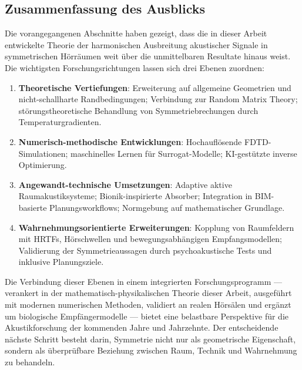 ﻿\documentclass[12pt, a4paper]{article}
\theoremstyle{definition}
\theoremstyle{remark}
\begin{document}
\subsection{Zusammenfassung des Ausblicks}

Die vorangegangenen Abschnitte haben gezeigt, dass die in dieser Arbeit
entwickelte Theorie der harmonischen Ausbreitung akustischer Signale
in symmetrischen Hörräumen weit über die unmittelbaren Resultate hinaus
weist. Die wichtigsten Forschungsrichtungen lassen sich drei Ebenen zuordnen:

\begin{enumerate}
\item \textbf{Theoretische Vertiefungen}: Erweiterung auf allgemeine
  Geometrien und nicht-schallharte Randbedingungen; Verbindung zur
  Random Matrix Theory; störungstheoretische Behandlung von
  Symmetriebrechungen durch Temperaturgradienten.

\item \textbf{Numerisch-methodische Entwicklungen}: Hochauflösende
  FDTD-Simulationen; maschinelles Lernen für Surrogat-Modelle;
  KI-gestützte inverse Optimierung.

\item \textbf{Angewandt-technische Umsetzungen}: Adaptive aktive
  Raumakustiksysteme; Bionik-inspirierte Absorber; Integration
  in BIM-basierte Planungsworkflows; Normgebung auf mathematischer
  Grundlage.

\item \textbf{Wahrnehmungsorientierte Erweiterungen}: Kopplung von Raumfeldern mit
  HRTFs, Hörschwellen und bewegungsabhängigen Empfangsmodellen; Validierung der
  Symmetrieaussagen durch psychoakustische Tests und inklusive Planungsziele.
\end{enumerate}

Die Verbindung dieser Ebenen in einem integrierten Forschungsprogramm --- verankert
in der mathematisch-physikalischen Theorie dieser Arbeit, ausgeführt mit modernen
numerischen Methoden, validiert an realen Hörsälen und ergänzt um biologische
Empfängermodelle --- bietet eine belastbare Perspektive für die Akustikforschung der
kommenden Jahre und Jahrzehnte. Der entscheidende nächste Schritt besteht darin,
Symmetrie nicht nur als geometrische Eigenschaft, sondern als überprüfbare Beziehung
zwischen Raum, Technik und Wahrnehmung zu behandeln.

\end{document}
